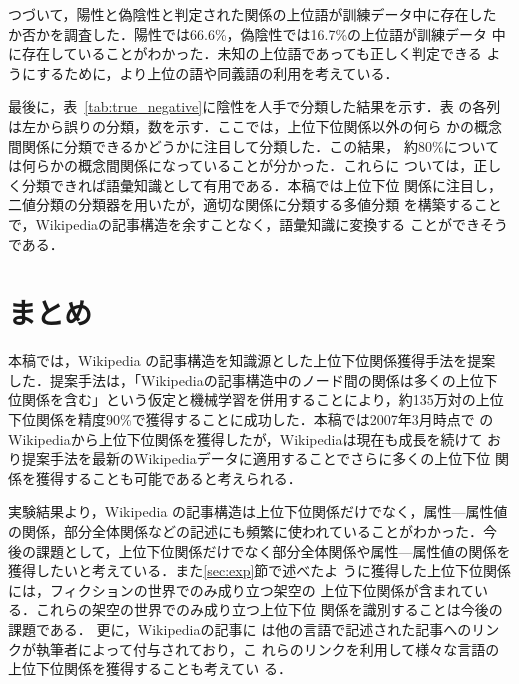 \documentclass[japanese]{jnlp_1.4}
\begin{document}
つづいて，陽性と偽陰性と判定された関係の上位語が訓練データ中に存在した
か否かを調査した．陽性では66.6\%，偽陰性では16.7\%の上位語が訓練データ
中に存在していることがわかった．未知の上位語であっても正しく判定できる
ようにするために，より上位の語や同義語の利用を考えている．

最後に，表~\ref{tab:true_negative}に陰性を人手で分類した結果を示す．表
の各列は左から誤りの分類，数を示す．ここでは，上位下位関係以外の何ら
かの概念間関係に分類できるかどうかに注目して分類した．この結果，
約80\%については何らかの概念間関係になっていることが分かった．これらに
ついては，正しく分類できれば語彙知識として有用である．本稿では上位下位
関係に注目し，二値分類の分類器を用いたが，適切な関係に分類する多値分類
を構築することで，Wikipediaの記事構造を余すことなく，語彙知識に変換する
ことができそうである．


\section{まとめ}\label{sec:matome}

本稿では，Wikipedia の記事構造を知識源とした上位下位関係獲得手法を提案
した．提案手法は，「Wikipediaの記事構造中のノード間の関係は多くの上位下
位関係を含む」という仮定と機械学習を併用することにより，約135万対の上位
下位関係を精度90\%で獲得することに成功した．本稿では2007年3月時点で
のWikipediaから上位下位関係を獲得したが，Wikipediaは現在も成長を続けて
おり提案手法を最新のWikipediaデータに適用することでさらに多くの上位下位
関係を獲得することも可能であると考えられる．

実験結果より，Wikipedia の記事構造は上位下位関係だけでなく，属性—属性値
の関係，部分全体関係などの記述にも頻繁に使われていることがわかった．今
後の課題として，上位下位関係だけでなく部分全体関係や属性—属性値の関係を
獲得したいと考えている．{また}\ref{sec:exp}{節で述べたよ
  うに獲得した上位下位関係には，フィクションの世界でのみ成り立つ架空の
  上位下位関係が含まれている．これらの架空の世界でのみ成り立つ上位下位
  関係を識別することは今後の課題である．} 更に，Wikipediaの記事に
は他の言語で記述された記事へのリンクが執筆者によって付与されており，こ
れらのリンクを利用して様々な言語の上位下位関係を獲得することも考えてい
る．
\end{document}
